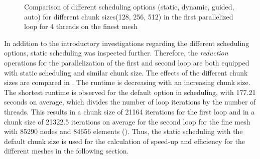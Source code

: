 \begin{figure}[h!]
	\centering
	\caption{\label{fig::Scheduling} Comparison of different scheduling options (static, dynamic, guided, auto) for different chunk sizes(128, 256, 512) in the first parallelized loop for 4 threads on the finest mesh}
\end{figure}

In addition to the introductory investigations regarding the different scheduling options, static scheduling was inspected further. Therefore, the \textit{reduction} operations for the parallelization of the first and second loop are both equipped with static scheduling and similar chunk size. The effects of the different chunk sizes are compared in . The runtime is decreasing with an increasing chunk size. The shortest runtime is observed for the default option in scheduling, with 177.21 seconds on average, which divides the number of loop iterations by the number of threads. This results in a chunk size of 21164 iterations for the first loop and in a chunk size of 21322.5 iterations on average for the second loop for the fine mesh with 85290 nodes and 84656 elements (). Thus, the static scheduling with the default chunk size is used for the calculation of speed-up and efficiency for the different meshes in the following section.

